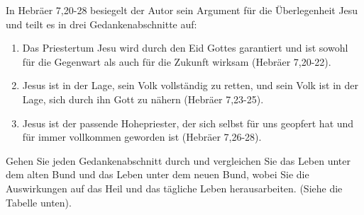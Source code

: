 \documentclass[
  12pt,
]{krantz}
\providecommand{\tightlist}{%
  \setlength{\itemsep}{0pt}\setlength{\parskip}{0pt}}
\begin{document}
In Hebräer 7,20-28 besiegelt der Autor sein Argument für die Überlegenheit Jesu und teilt es in drei Gedankenabschnitte auf:

\begin{enumerate}
\def\labelenumi{\arabic{enumi}.}
\tightlist
\item
  Das Priestertum Jesu wird durch den Eid Gottes garantiert und ist sowohl für die Gegenwart als auch für die Zukunft wirksam (Hebräer 7,20-22).
\item
  Jesus ist in der Lage, sein Volk vollständig zu retten, und sein Volk ist in der Lage, sich durch ihn Gott zu nähern (Hebräer 7,23-25).
\item
  Jesus ist der passende Hohepriester, der sich selbst für uns geopfert hat und für immer vollkommen geworden ist (Hebräer 7,26-28).
\end{enumerate}

Gehen Sie jeden Gedankenabschnitt durch und vergleichen Sie das Leben unter dem alten Bund und das Leben unter dem neuen Bund, wobei Sie die Auswirkungen auf das Heil und das tägliche Leben herausarbeiten. (Siehe die Tabelle unten).
\end{document}
